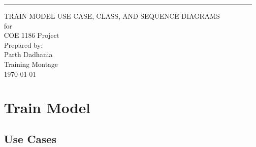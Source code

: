 \documentclass{scrreprt}
\begin{document}
\begin{flushright}
    \rule{16cm}{5pt}\vskip1cm
    \begin{bfseries}
        \Huge{TRAIN MODEL USE CASE, CLASS, AND SEQUENCE DIAGRAMS}\\
        \vspace{.9cm}
        for\\
        \vspace{.9cm}
        COE 1186 Project\\
        \vspace{.9cm}
        \vspace{.9cm}
        Prepared by:\\
        Parth Dadhania\\
        \vspace{4.9cm}
        Training Montage\\
        \vspace{.9cm}
        \today\\
    \end{bfseries}
\end{flushright}

\tableofcontents

\chapter{Train Model}

\section{Use Cases}
\end{document}
